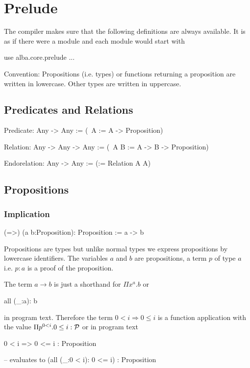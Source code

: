 \section{Prelude}

The compiler makes sure that the following definitions are always
available. It is as if there were a module  and each
module would start with
\begin{alba}
  use
     alba.core.prelude
     ...
\end{alba}


Convention: Propositions (i.e. types) or functions returning a proposition are
written in lowercase. Other types are written in uppercase.





\subsection{Predicates and Relations}
\label{sec:predicates-and-relations}

\begin{alba}
  Predicate: Any -> Any
    := (\ A := A -> Proposition)

  Relation: Any -> Any -> Any
    := (\ A B := A -> B -> Proposition)

  Endorelation: Any -> Any
    := (\A := Relation A A)
\end{alba}
\vskip 2mm







\subsection{Propositions}
\label{sec:prelude-propositions}


\subsubsection{Implication}
%
\begin{alba}
  (=>) (a b:Proposition): Proposition
    := a -> b
\end{alba}

Propositions are types but unlike normal types we express propositions by
lowercase identifiers. The variables $a$ and $b$ are propositions, a term $p$
of type $a$ i.e. $p:a$ is a proof of the proposition.

The term $a\to b$ is just a shorthand for $\Pi x^a.b$ or
\begin{alba}
  all (_:a): b
\end{alba}
in program text. Therefore the term $0 < i \Rightarrow 0 \le i$ is a function
application with the value $\Pi p^{0 < i}. 0 \le i : {\cal{P}}$ or in program text
\begin{alba}
  0 < i => 0 <= i           : Proposition

  -- evaluates to
  (all (_:0 < i): 0 <= i)  : Proposition
\end{alba}
\vskip 2mm






